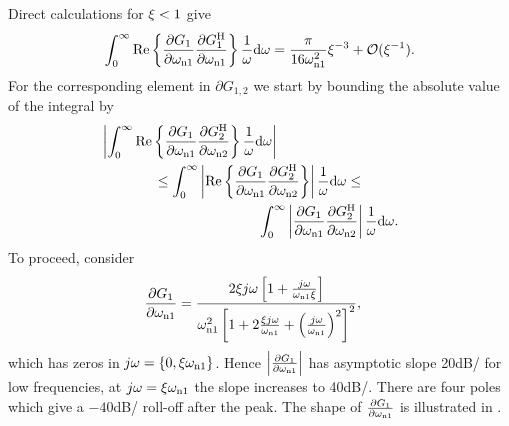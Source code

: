 Direct calculations for $\damping < 1$ give
\begin{align}
\label{eq:excitation:auto}
\int_0^\infty\mathrm{Re}\left\{\frac{\partial G_1}{\partial \wn[1]}\frac{\partial G_1^{\HT}}{\partial \wn[1]}\right\}\frac{1}{\omega}\dd\omega = \frac{\pi}{16\wn[1]^2}\damping^{-3} + \mathcal{O}(\damping^{-1}).
\end{align}
For the corresponding element in $\partial G_{1,2}$ we start by bounding the absolute value of the integral by
\begin{gather}
\left|\int_0^\infty\mathrm{Re}\left\{\frac{\partial G_1}{\partial \wn[1]}\frac{\partial G_2^{\HT}}{\partial \wn[2]}\right\}\frac{1}{\omega}\dd\omega\right|
\qquad \qquad \qquad \qquad \qquad
\label{eq:excitation:cross1} \\
\leq
\int_0^\infty\left|\mathrm{Re}\left\{\frac{\partial G_1}{\partial \wn[1]}\frac{\partial G_2^{\HT}}{\partial \wn[2]}\right\}\right|\frac{1}{\omega}\dd\omega
\leq \\
\qquad \qquad \qquad \qquad \qquad
\int_0^\infty\left|\frac{\partial G_1}{\partial \wn[1]}\frac{\partial G_2^{\HT}}{\partial \wn[2]}\right|\frac{1}{\omega}\dd\omega \text{.}\label{eq:excitation:cross}
\end{gather}
To proceed, consider
\begin{align}
\frac{\partial G_1}{\partial \wn[1]} &= \frac{2\damping j\omega\left[1+\frac{j\omega}{\wn[1]\damping}\right]}{\wn[1]^2\left[1+2\frac{\damping j\omega}{\wn[1]} + \left(\frac{j\omega}{\wn[1]}\right)^2\right]^2},
\end{align}
which has zeros in $j\omega=\left\{0, \damping\wn[1]\right\}$. 
Hence $\left|\frac{\partial G_1}{\partial \wn[1]} \right|$ has asymptotic slope 20\unit{dB/\decade} for low frequencies, at $j\omega=\damping\wn[1]$ the slope increases to 40\unit{dB/\decade}. There are four poles which give a $-40$\unit{dB/\decade} roll-off after the peak. 
The shape of $\frac{\partial G_1}{\partial \wn[1]} $ is illustrated in .

